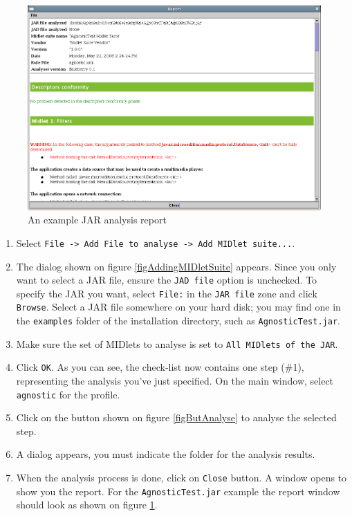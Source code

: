  \begin{figure}[h]
 \begin{center}
 \includegraphics[width=15cm]{figures/reportAgnosticTest}
 \end{center}
 \caption{An example JAR analysis report}
 \label{figExampleReport}
 \end{figure} 
    
 \begin{enumerate}
 \item Select \texttt{File -> Add File to analyse -> Add MIDlet suite...}.
 \item The dialog shown on figure \ref{figAddingMIDletSuite} appears. 
 Since you only want to select a JAR file, ensure the \texttt{JAD file}
 option is unchecked. To specify the JAR you want, select
 \texttt{File:} in the \texttt{JAR file} zone and click
 \texttt{Browse}. Select a JAR file somewhere on your hard disk; you
 may find one in the \texttt{examples} folder of the installation
 directory, such as \texttt{AgnosticTest.jar}.
 \item Make sure the set of MIDlets to analyse is set to \texttt{All MIDlets of
 the JAR}.
 \item Click \texttt{OK}. As you can see, the check-list now contains
   one step (\#1), representing the analysis you've just
   specified. On the main window, select \texttt{agnostic} for the profile.
 \item{Click on the button shown on figure \ref{figButAnalyse} to
 analyse the selected step.} 
 \item A dialog appears, you must indicate the folder for the analysis results.
 \item When the analysis process is done, click on \texttt{Close} button. A
 window opens to show you the report. For the \texttt{AgnosticTest.jar} example
   the report window should look as shown on figure
   \ref{figExampleReport}.
 \end{enumerate}

